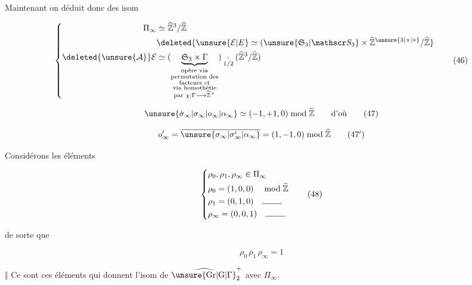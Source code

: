 
Maintenant on déduit donc des isom

\[
\left\{\begin{aligned}
\Pi_\infty&\simeq\widehat{\mathbb Z}^{3}/\widehat{\mathbb Z}\\
&\deleted{\unsure{\mathcal E|E}\simeq(\unsure{\mathfrak S_3|\mathscr S_3}\times\widehat{\mathbb Z}^{\unsure{3|\times|*}}/\widehat{\mathbb Z}}\\
\deleted{\unsure{\mathcal A}}\mathcal E&\simeq(\underbrace{\mathfrak S_3\times\Gamma}_{\substack{\text{opère via}\\\text{permutation des}\\\text{facteurs et}\\\text{via homothétie}\\\text{par }\chi:\Gamma\longrightarrow\widehat{\mathbb Z}^{\times}}})\underset{1/2}{\cdot}(\widehat{\mathbb Z}^{3}/\widehat{\mathbb Z})
\end{aligned}\right.\tag*{(46)}
\]


\[
\unsure{\dot\sigma_\infty|\sigma_\infty|o_\infty|\alpha_\infty}\simeq(-1,+1,0)\bmod\widehat{\mathbb Z}\qquad\text{d'où}
\tag*{(47)}
\]

\[
o'_\infty=\overline{\unsure{\sigma_\infty|\sigma'_\infty|\alpha_\infty}}=(1,-1,0)\bmod\widehat{\mathbb Z}
\tag*{(47$'$)}
\]

Considérons les éléments

\[
\left\{\begin{aligned}
&\rho_0,\rho_1,\rho_\infty\in\Pi_\infty\\
&\rho_0=(1,0,0)\quad\bmod\widehat{\mathbb Z}\\
&\rho_1=(0,1,0)\quad\rule{2.4em}{0.4pt}\\
&\rho_\infty=(0,0,1)\quad\rule{2.4em}{0.4pt}
\end{aligned}\right.\tag*{(48)}
\]

de sorte que

\[
\rho_0\,\rho_1\,\rho_\infty=1
\tag*{(49)}
\]

$\big\Vert$ Ce sont ces éléments qui donnent l'isom de $\widehat{\unsure{\mathrm{Gr}|\mathrm G|\Gamma}}_2^+$ avec $\Pi_\infty$.

